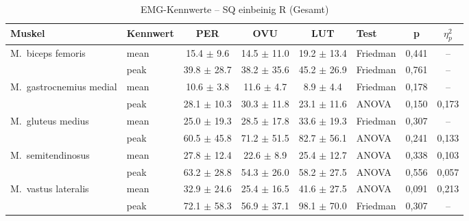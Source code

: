 \begin{table}[H]
  \centering
  \caption{EMG-Kennwerte – SQ einbeinig R (Gesamt)}
  \label{tab:SQ_einbeinig_R_Gesamt}
  \small
  \begin{tabular}{l l c c c l c c}
    \hline
    \textbf{Muskel} & \textbf{Kennwert} & \textbf{PER} & \textbf{OVU} & \textbf{LUT} & \textbf{Test} & \textbf{p} & \textbf{$\eta^2_p$} \\
    \hline
    M.~biceps femoris & mean & 15.4 $\pm$ 9.6 & 14.5 $\pm$ 11.0 & 19.2 $\pm$ 13.4 & Friedman & 0{,}441 & -- \\
     & peak & 39.8 $\pm$ 28.7 & 38.2 $\pm$ 35.6 & 45.2 $\pm$ 26.9 & Friedman & 0{,}761 & -- \\
    \hline
    M.~gastrocnemius medial & mean & 10.6 $\pm$ 3.8 & 11.6 $\pm$ 4.7 & 8.9 $\pm$ 4.4 & Friedman & 0{,}178 & -- \\
     & peak & 28.1 $\pm$ 10.3 & 30.3 $\pm$ 11.8 & 23.1 $\pm$ 11.6 & ANOVA & 0{,}150 & 0{,}173 \\
    \hline
    M.~gluteus medius & mean & 25.0 $\pm$ 19.3 & 28.5 $\pm$ 17.8 & 33.6 $\pm$ 19.3 & Friedman & 0{,}307 & -- \\
     & peak & 60.5 $\pm$ 45.8 & 71.2 $\pm$ 51.5 & 82.7 $\pm$ 56.1 & ANOVA & 0{,}241 & 0{,}133 \\
    \hline
    M.~semitendinosus & mean & 27.8 $\pm$ 12.4 & 22.6 $\pm$ 8.9 & 25.4 $\pm$ 12.7 & ANOVA & 0{,}338 & 0{,}103 \\
     & peak & 63.2 $\pm$ 28.8 & 54.3 $\pm$ 26.0 & 58.2 $\pm$ 27.5 & ANOVA & 0{,}556 & 0{,}057 \\
    \hline
    M.~vastus lateralis & mean & 32.9 $\pm$ 24.6 & 25.4 $\pm$ 16.5 & 41.6 $\pm$ 27.5 & ANOVA & 0{,}091 & 0{,}213 \\
     & peak & 72.1 $\pm$ 58.3 & 56.9 $\pm$ 37.1 & 98.1 $\pm$ 70.0 & Friedman & 0{,}307 & -- \\
    \hline
  \end{tabular}
\end{table}
